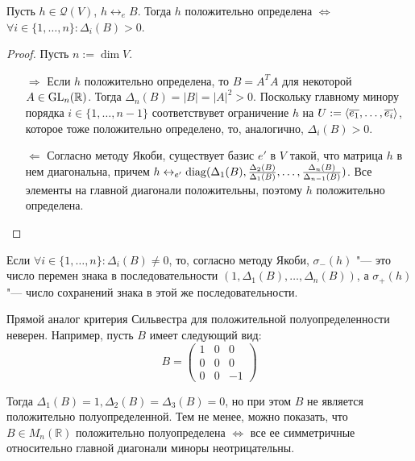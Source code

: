 \begin{theorem}
	Пусть $h \in \mathcal{Q}(V)$, $h \leftrightarrow_e B$. Тогда $h$ положительно определена $\Leftrightarrow$ $\forall i \in \{1, \dots, n\}: \Delta_i(B) > 0$.
\end{theorem}

\begin{proof} Пусть $n := \dim{V}$.
	\begin{itemize}
		\item[$\Rightarrow$] Если $h$ положительно определена, то $B = A^TA$ для некоторой $A \in \operatorname{GL}_n(\mathbb{R})$. Тогда $\Delta_n(B) = |B| = |A|^2 > 0$. Поскольку главному минору порядка $i \in \{1, \dots, n - 1\}$ соответствувет ограничение $h$ на $U \hm{:=} \langle\overline{e_1}, \dots, \overline{e_i}\rangle$, которое тоже положительно определено, то, аналогично, $\Delta_i(B) > 0$.
		\item[$\Leftarrow$] Согласно методу Якоби, существует базис $e'$ в $V$ такой, что матрица $h$ в нем диагональна, причем $h \leftrightarrow_{e'} \operatorname{diag}(\Delta_1(B), \frac{\Delta_2(B)}{\Delta_1(B)}, \dotsc, \frac{\Delta_{n}(B)}{\Delta_{n-1}(B)})$. Все элементы на главной диагонали положительны, поэтому $h$ положительно определена.\qedhere
	\end{itemize}
\end{proof}

\begin{note}
	Если $\forall i \in \{1, \dots, n\}: \Delta_i(B) \ne 0$, то, согласно методу Якоби, $\sigma_-(h)$ "--- это число перемен знака в последовательности $(1, \Delta_1(B), \dots, \Delta_n(B))$, а $\sigma_+(h)$ "--- число сохранений знака в этой же последовательности.
\end{note}

\begin{note}
	Прямой аналог критерия Сильвестра для положительной полуопределенности неверен. Например, пусть $B$ имеет следующий вид:
	\[B = \begin{pmatrix}
		1&0&0\\
		0&0&0\\
		0&0&-1
	\end{pmatrix}\]
	
	Тогда $\Delta_1(B) = 1, \Delta_2(B) = \Delta_3(B) = 0$, но при этом $B$ не является положительно полуопределенной. Тем не менее, можно показать, что $B \in M_n(\mathbb{R})$ положительно полуопределена $\Leftrightarrow$ все ее симметричные относительно главной диагонали миноры неотрицательны.
\end{note}

